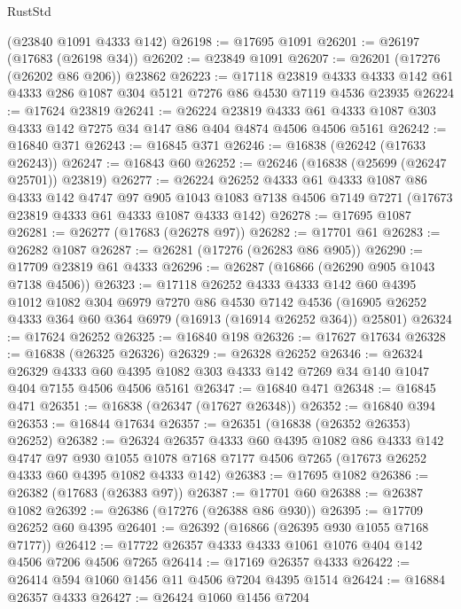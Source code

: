 \begin{lexlean}{RustStd}
\begin{coremodule}
    (@23840 @1091 @4333 @142)
@26198 := @17695 @1091
@26201 := @26197 (@17683 (@26198 @34))
@26202 := @23849 @1091
@26207 := @26201 (@17276 (@26202 @86 @206)) @23862
@26223 := @17118
    @23819
    @4333
    @4333
    @142
    @61
    @4333
    @286
    @1087
    @304
    @5121
    @7276
    @86
    @4530
    @7119
    @4536
    @23935
@26224 := @17624 @23819
@26241 := @26224
    @23819
    @4333
    @61
    @4333
    @1087
    @303
    @4333
    @142
    @7275
    @34
    @147
    @86
    @404
    @4874
    @4506
    @4506
    @5161
@26242 := @16840 @371
@26243 := @16845 @371
@26246 := @16838 (@26242 (@17633 @26243))
@26247 := @16843 @60
@26252 := @26246 (@16838 (@25699 (@26247 @25701)) @23819)
@26277 := @26224
    @26252
    @4333
    @61
    @4333
    @1087
    @86
    @4333
    @142
    @4747
    @97
    @905
    @1043
    @1083
    @7138
    @4506
    @7149
    @7271
    (@17673 @23819 @4333 @61 @4333 @1087 @4333 @142)
@26278 := @17695 @1087
@26281 := @26277 (@17683 (@26278 @97))
@26282 := @17701 @61
@26283 := @26282 @1087
@26287 := @26281 (@17276 (@26283 @86 @905))
@26290 := @17709 @23819 @61 @4333
@26296 := @26287 (@16866 (@26290 @905 @1043 @7138 @4506))
@26323 := @17118
    @26252
    @4333
    @4333
    @142
    @60
    @4395
    @1012
    @1082
    @304
    @6979
    @7270
    @86
    @4530
    @7142
    @4536
    (@16905 @26252 @4333 @364 @60 @364 @6979 (@16913 (@16914 @26252 @364)) @25801)
@26324 := @17624 @26252
@26325 := @16840 @198
@26326 := @17627 @17634
@26328 := @16838 (@26325 @26326)
@26329 := @26328 @26252
@26346 := @26324
    @26329
    @4333
    @60
    @4395
    @1082
    @303
    @4333
    @142
    @7269
    @34
    @140
    @1047
    @404
    @7155
    @4506
    @4506
    @5161
@26347 := @16840 @471
@26348 := @16845 @471
@26351 := @16838 (@26347 (@17627 @26348))
@26352 := @16840 @394
@26353 := @16844 @17634
@26357 := @26351 (@16838 (@26352 @26353) @26252)
@26382 := @26324
    @26357
    @4333
    @60
    @4395
    @1082
    @86
    @4333
    @142
    @4747
    @97
    @930
    @1055
    @1078
    @7168
    @7177
    @4506
    @7265
    (@17673 @26252 @4333 @60 @4395 @1082 @4333 @142)
@26383 := @17695 @1082
@26386 := @26382 (@17683 (@26383 @97))
@26387 := @17701 @60
@26388 := @26387 @1082
@26392 := @26386 (@17276 (@26388 @86 @930))
@26395 := @17709 @26252 @60 @4395
@26401 := @26392 (@16866 (@26395 @930 @1055 @7168 @7177))
@26412 := @17722 @26357 @4333 @4333 @1061 @1076 @404 @142 @4506 @7206 @4506 @7265
@26414 := @17169 @26357 @4333
@26422 := @26414 @594 @1060 @1456 @11 @4506 @7204 @4395 @1514
@26424 := @16884 @26357 @4333
@26427 := @26424 @1060 @1456 @7204

\end{coremodule}
\end{lexlean}
